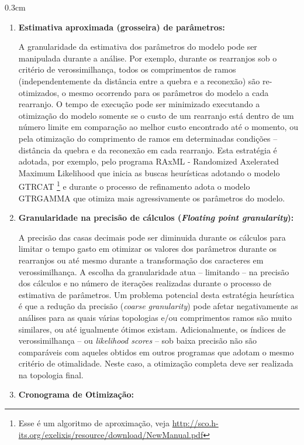 \begin{refsection}
\begin {myindentpar}{0.3cm}
\begin{enumerate}[\itshape i.]
	\item{\textbf{Estimativa aproximada (grosseira) de parâmetros:}}\label{tut13:dynamic:gran_par}

A granularidade da estimativa dos parâmetros do modelo pode ser manipulada durante a análise. Por exemplo, durante os rearranjos sob o critério de verossimilhança, todos os comprimentos de ramos (independentemente da distância entre a quebra e a reconexão) são re-otimizados, o mesmo ocorrendo para os parâmetros do modelo a cada rearranjo. O tempo de execução pode ser minimizado executando a otimização do modelo somente se o custo de um rearranjo está dentro de um número limite em comparação ao melhor custo encontrado até o momento, ou pela otimização do comprimento de ramos em determinadas condições -- distância da quebra e da reconexão em cada rearranjo. Esta estratégia é adotada, por exemplo, pelo programa RAxML - Randomized Axelerated Maximum Likelihood \parencite[][]{Stamatakis_2014} que inicia as buscas heurísticas adotando o modelo GTRCAT \footnote{Esse é um algoritmo de aproximação, veja \url{http://sco.h-its.org/exelixis/resource/download/NewManual.pdf}} e durante o processo de refinamento adota o modelo GTRGAMMA que otimiza mais agressivamente os parâmetros do modelo.

	\item{\textbf{Granularidade na precisão de cálculos (\textit{Floating point granularity}):}}\label{tut13:dynamic:gran_float}

A precisão das casas decimais pode ser diminuida durante os cálculos para limitar o tempo gasto em otimizar os valores dos parâmetros durante os rearranjos ou até mesmo durante a transformação dos caracteres em verossimilhança. A escolha da granularidade atua -- limitando -- na precisão dos cálculos e no número de iterações realizadas durante o processo de estimativa de parâmetros. Um problema potencial desta estratégia heurística é que a redução da precisão (\textit{coarse granularity}) pode afetar negativamente as análises para as quais várias topologias e/ou comprimentos ramos são muito similares, ou até igualmente ótimos existam. Adicionalmente, os índices de verossimilhança -- ou \textit{likelihood scores} -- sob baixa precisão não são comparáveis com aqueles obtidos em outros programas que adotam o mesmo critério de otimalidade. Neste caso, a otimização completa deve ser realizada na topologia final.

	\item{\textbf{Cronograma de Otimização:}}\label{tut13:dynamic:string}


\end{enumerate}
\end{myindentpar}
\end{refsection}

